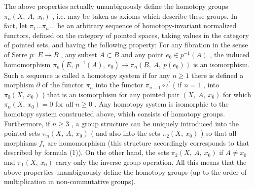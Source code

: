 The above properties actually unambiguously define the homotopy groups $  \pi _{n} ( X ,\  A ,\  x _{0} ) $ , 
i.e. may be taken as axioms which describe these groups. In fact, let $  \pi _{1} \dots \pi _{n} \dots $ 
be an arbitrary sequence of homotopy-invariant normalized functors, defined on the category of pointed spaces, taking values in the category of pointed sets, and having the following property: For any fibration in the sense of Serre $  p : \  E \rightarrow B $ , 
any subset $  A \subset B $ 
and any point $  e _{0} \in p ^{-1} (A) $ , 
the induced homomorphism $  \pi _{n} ( E ,\  p ^{-1} (A) ,\  e _{0} ) \rightarrow \pi _{n} ( B ,\  A ,\  p ( e _{0} ) ) $ 
is an isomorphism. Such a sequence is called a homotopy system if for any $  n \geq 1 $ 
there is defined a morphism $  \partial $ 
of the functor $  \pi _{n} $ 
into the functor $  \pi _{n-1} \circ \iota ^ \prime  $ (
if $  n = 1 $ , 
into $  \pi _{0} ( X ,\  x _{0} ) $ ) 
that is an isomorphism for any pointed pair $  ( X ,\  A ,\  x _{0} ) $ 
for which $  \pi _{n} (X ,\  x _{0} ) = 0 $ 
for all $  n \geq 0 $ . 
Any homotopy system is isomorphic to the homotopy system constructed above, which consists of homotopy groups. Furthermore, if $  n \geq 3 $ , 
a group structure can be uniquely introduced into the pointed sets $  \pi _{n} (X,\  A,\  x _{0} ) $ (
and also into the sets $  \pi _{2} ( X ,\  x _{0} ) $ ) 
so that all morphisms $  f _ \star  $ 
are homomorphism (this structure accordingly corresponds to that described by formula (1)). On the other hand, the sets $  \pi _{2} ( X ,\  A ,\  x _{0} ) $ 
if $  A \neq x _{0} $ 
and $  \pi _{1} ( X ,\  x _{0} ) $ 
carry only the inverse group operation. All this means that the above properties unambiguously define the homotopy groups (up to the order of multiplication in non-commutative groups).

